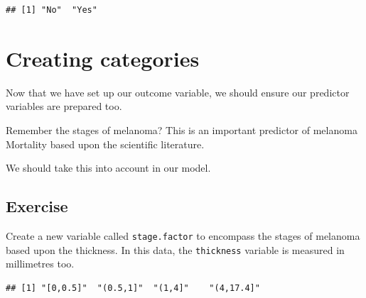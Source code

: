 \documentclass[12pt,]{krantz}
\makeatletter
\newenvironment{Shaded}{\begin{snugshade}}{\end{snugshade}}
\newcommand{\CommentTok}[1]{\textcolor[rgb]{0.56,0.35,0.01}{\textit{#1}}}
\newcommand{\DataTypeTok}[1]{\textcolor[rgb]{0.13,0.29,0.53}{#1}}
\newcommand{\DecValTok}[1]{\textcolor[rgb]{0.00,0.00,0.81}{#1}}
\newcommand{\FloatTok}[1]{\textcolor[rgb]{0.00,0.00,0.81}{#1}}
\newcommand{\KeywordTok}[1]{\textcolor[rgb]{0.13,0.29,0.53}{\textbf{#1}}}
\newcommand{\NormalTok}[1]{#1}
\newcommand{\OperatorTok}[1]{\textcolor[rgb]{0.81,0.36,0.00}{\textbf{#1}}}
\newcommand{\StringTok}[1]{\textcolor[rgb]{0.31,0.60,0.02}{#1}}
\newenvironment{kframe}{%
\medskip{}
\setlength{\fboxsep}{.8em}
 \def\at@end@of@kframe{}%
 \ifinner\ifhmode%
  \def\at@end@of@kframe{\end{minipage}}%
  \begin{minipage}{\columnwidth}%
 \fi\fi%
 \def\FrameCommand##1{\hskip\@totalleftmargin \hskip-\fboxsep
 \colorbox{shadecolor}{##1}\hskip-\fboxsep
     \hskip-\linewidth \hskip-\@totalleftmargin \hskip\columnwidth}%
 \MakeFramed {\advance\hsize-\width
   \@totalleftmargin\z@ \linewidth\hsize
   \@setminipage}}%
 {\par\unskip\endMakeFramed%
 \at@end@of@kframe}
\renewenvironment{Shaded}{\begin{kframe}}{\end{kframe}}
\theoremstyle{definition}
\theoremstyle{definition}
\theoremstyle{definition}
\theoremstyle{remark}
\makeatother
\begin{document}
\begin{verbatim}
## [1] "No"  "Yes"
\end{verbatim}

\hypertarget{creating-categories}{%
\section{Creating categories}\label{creating-categories}}

Now that we have set up our outcome variable, we should ensure our
predictor variables are prepared too.

Remember the stages of melanoma? This is an important predictor of
melanoma Mortality based upon the scientific literature.

We should take this into account in our model.

\hypertarget{exercise-27}{%
\subsection{Exercise}\label{exercise-27}}

Create a new variable called \texttt{stage.factor} to encompass the
stages of melanoma based upon the thickness. In this data, the
\texttt{thickness} variable is measured in millimetres too.

\begin{Shaded}
\end{Shaded}

\begin{verbatim}
## [1] "[0,0.5]"  "(0.5,1]"  "(1,4]"    "(4,17.4]"
\end{verbatim}
\end{document}
